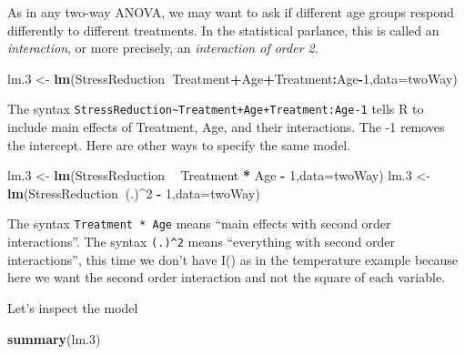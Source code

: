 \documentclass[]{book}
\newenvironment{Shaded}{\begin{snugshade}}{\end{snugshade}}
\newcommand{\KeywordTok}[1]{\textcolor[rgb]{0.13,0.29,0.53}{\textbf{#1}}}
\newcommand{\DataTypeTok}[1]{\textcolor[rgb]{0.13,0.29,0.53}{#1}}
\newcommand{\DecValTok}[1]{\textcolor[rgb]{0.00,0.00,0.81}{#1}}
\newcommand{\StringTok}[1]{\textcolor[rgb]{0.31,0.60,0.02}{#1}}
\newcommand{\OperatorTok}[1]{\textcolor[rgb]{0.81,0.36,0.00}{\textbf{#1}}}
\newcommand{\NormalTok}[1]{#1}
\theoremstyle{definition}
\theoremstyle{definition}
\theoremstyle{definition}
\theoremstyle{remark}
\begin{document}
As in any two-way ANOVA, we may want to ask if different age groups
respond differently to different treatments. In the statistical
parlance, this is called an \emph{interaction}, or more precisely, an
\emph{interaction of order 2}.

\begin{Shaded}
\begin{Highlighting}[]
\NormalTok{lm.}\DecValTok{3}\NormalTok{ <-}\StringTok{ }\KeywordTok{lm}\NormalTok{(StressReduction}\OperatorTok{~}\NormalTok{Treatment}\OperatorTok{+}\NormalTok{Age}\OperatorTok{+}\NormalTok{Treatment}\OperatorTok{:}\NormalTok{Age}\OperatorTok{-}\DecValTok{1}\NormalTok{,}\DataTypeTok{data=}\NormalTok{twoWay)}
\end{Highlighting}
\end{Shaded}

The syntax
\texttt{StressReduction\textasciitilde{}Treatment+Age+Treatment:Age-1}
tells R to include main effects of Treatment, Age, and their
interactions. The -1 removes the intercept. Here are other ways to
specify the same model.

\begin{Shaded}
\begin{Highlighting}[]
\NormalTok{lm.}\DecValTok{3}\NormalTok{ <-}\StringTok{ }\KeywordTok{lm}\NormalTok{(StressReduction }\OperatorTok{~}\StringTok{ }\NormalTok{Treatment }\OperatorTok{*}\StringTok{ }\NormalTok{Age }\OperatorTok{-}\StringTok{ }\DecValTok{1}\NormalTok{,}\DataTypeTok{data=}\NormalTok{twoWay)}
\NormalTok{lm.}\DecValTok{3}\NormalTok{ <-}\StringTok{ }\KeywordTok{lm}\NormalTok{(StressReduction}\OperatorTok{~}\NormalTok{(.)}\OperatorTok{^}\DecValTok{2} \OperatorTok{-}\StringTok{ }\DecValTok{1}\NormalTok{,}\DataTypeTok{data=}\NormalTok{twoWay)}
\end{Highlighting}
\end{Shaded}

The syntax \texttt{Treatment\ *\ Age} means ``main effects with second
order interactions''. The syntax \texttt{(.)\^{}2} means ``everything
with second order interactions'', this time we don't have I() as in the
temperature example because here we want the second order interaction
and not the square of each variable.

Let's inspect the model

\begin{Shaded}
\begin{Highlighting}[]
\KeywordTok{summary}\NormalTok{(lm.}\DecValTok{3}\NormalTok{)}
\end{Highlighting}
\end{Shaded}
\end{document}
